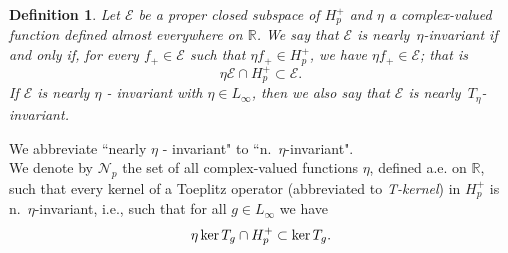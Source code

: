 \documentclass[11pt]{article}
\def\E{\mathcal{E}}
\def\RR{\mathbb{R}}
\def\Hp{H_p^+}
\def\Np{\widetilde{\mathcal{N}_p}}
\def\ker{\mathop{\rm ker}\nolimits}
\def\nei#1{n.~$#1$-in\-vari\-ant}
\newtheorem{defn}[thm]{Definition}
\numberwithin{equation}{section}
\begin{document}
%
%

 






\begin{defn}  \cite{CP14}
 Let  $\mathcal{E}$ be a proper closed subspace of $H_p^+$ and $\eta$ a complex-valued function defined almost everywhere on $\RR$. We say that $\mathcal{E}$ is \emph{nearly}~$\eta$-\emph{invariant} if and only if, for every $f_+\in \mathcal{E}$ such that $\eta f_+ \in H_p^+$, we have $\eta f_+ \in \mathcal{E}$; that is
\begin{equation}\label{21.1}
\eta\mathcal{E} \cap H_p^+ \subset \mathcal{E} .
\end{equation}
If $\mathcal{E}$ is nearly $\eta$ - invariant with $\eta \in L_{\infty}$, then we also say that $\mathcal{E}$ is \emph{nearly}~$T_\eta$-\emph{invariant}.
\end{defn}

We abbreviate ``nearly $\eta$ - invariant" to ``\nei{\eta}".\\ 

We denote by $\mathcal{N}_p$ the set of all complex-valued functions $\eta$, defined a.e. on $\RR$, such that every kernel of a Toeplitz operator (abbreviated to \emph {T-kernel}) in $H_p^+$ is \nei{\eta}, i.e., such that for all $g \in L_\infty$ we have
\begin{equation}\label{21.2}
\eta\ker T_g\cap H_p^+ \subset \ker T_g.
\end{equation}
\end{document}
